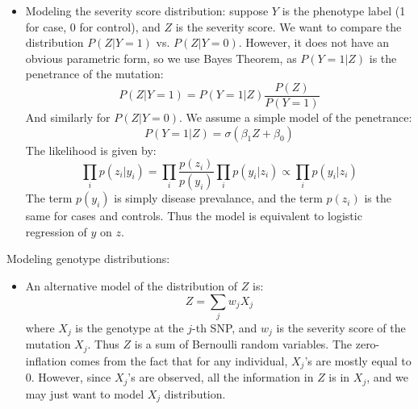 \documentclass[11pt]{article}
\begin{document}
\begin{enumerate}
\begin{itemize}
\item Modeling the severity score distribution: suppose $Y$ is the phenotype label (1 for case, 0 for control), and $Z$ is the severity score. We want to compare the distribution $P(Z|Y=1)$ vs. $P(Z|Y=0)$. However, it does not have an obvious parametric form, so we use Bayes Theorem, as $P(Y=1|Z)$ is the penetrance of the mutation: 
\begin{equation}
P(Z|Y=1) = P(Y=1|Z) \frac{P(Z)}{P(Y=1)}	
\end{equation}
And similarly for $P(Z|Y=0)$. We assume a simple model of the penetrance: 
\begin{equation}
P(Y=1|Z) = \sigma(\beta_1 Z + \beta_0)	
\end{equation}
The likelihood is given by: 
\begin{equation}
\prod_i p(z_i|y_i) = \prod_i \frac{p(z_i)}{p(y_i)} \prod_i p(y_i | z_i)	\propto \prod_i p(y_i | z_i)
\end{equation}
The term $p(y_i)$ is simply disease prevalance, and the term $p(z_i)$ is the same for cases and controls. Thus the model is equivalent to logistic regression of $y$ on $z$. 

\end{itemize}

Modeling genotype distributions: 
\begin{itemize}
\item An alternative model of the distribution of $Z$ is: 
\begin{equation}
Z = \sum_j w_j X_j
\end{equation}
where $X_j$ is the genotype at the $j$-th SNP, and $w_j$ is the severity score of the mutation $X_j$. Thus $Z$ is a sum of Bernoulli random variables. The zero-inflation comes from the fact that for any individual, $X_j$'s are mostly equal to 0. However, since $X_j$'s are observed, all the information in $Z$ is in $X_j$, and we may just want to model $X_j$ distribution. 


\end{itemize}
\end{enumerate}
\end{document}
